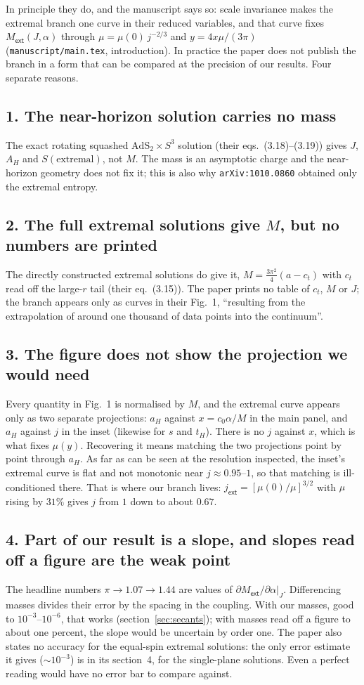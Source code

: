 \documentclass[11pt,a4paper]{article}
\newcommand{\q}[1]{\subsection*{\color{accent}#1}}
\newcommand{\ext}{\mathsf{ext}}
\begin{document}
\noindent In principle they do, and the manuscript says so: scale invariance
makes the extremal branch one curve in their reduced variables, and that curve
fixes $M_\ext(J,\alpha)$ through $\mu=\mu(0)\,j^{-2/3}$ and $y=4x\mu/(3\pi)$
(\texttt{manuscript/main.tex}, introduction). In practice the paper does not
publish the branch in a form that can be compared at the precision of our
results. Four separate reasons.

\q{1. The near-horizon solution carries no mass}

The exact rotating squashed $\mathrm{AdS}_2\times S^3$ solution (their
eqs.~(3.18)--(3.19)) gives $J$, $A_H$ and $S(\text{extremal})$, not $M$. The mass
is an asymptotic charge and the near-horizon geometry does not fix it; this is
also why \texttt{arXiv:1010.0860} obtained only the extremal entropy.

\q{2. The full extremal solutions give $M$, but no numbers are printed}

The directly constructed extremal solutions do give it,
$M=\tfrac{3\pi^2}{4}(a-c_t)$ with $c_t$ read off the large-$r$ tail
(their eq.~(3.15)). The paper prints no table of $c_t$, $M$ or $J$; the branch
appears only as curves in their Fig.~1, ``resulting from the extrapolation of
around one thousand of data points into the continuum''.

\q{3. The figure does not show the projection we would need}

Every quantity in Fig.~1 is normalised by $M$, and the extremal curve appears
only as two separate projections: $a_H$ against $x=c_0\alpha/M$ in the main
panel, and $a_H$ against $j$ in the inset (likewise for $s$ and $t_H$). There is
no $j$ against $x$, which is what fixes $\mu(y)$. Recovering it means matching
the two projections point by point through $a_H$. As far as can be seen at the
resolution inspected, the inset's extremal curve is flat and not monotonic near
$j\approx0.95$--$1$, so that matching is ill-conditioned there. That is where our
branch lives: $j_\ext=[\mu(0)/\mu]^{3/2}$ with $\mu$ rising by $31\%$ gives $j$
from $1$ down to about $0.67$.

\q{4. Part of our result is a slope, and slopes read off a figure are the weak point}

The headline numbers $\pi\to1.07\to1.44$ are values of
$\partial M_\ext/\partial\alpha|_J$. Differencing masses divides their error by
the spacing in the coupling. With our masses, good to $10^{-3}$--$10^{-6}$, that
works (section~\ref{sec:secants}); with masses read off a figure to about one
percent, the slope would be uncertain by order one. The paper also states no accuracy for the equal-spin extremal
solutions: the only error estimate it gives ($\sim10^{-3}$) is in its section~4,
for the single-plane solutions. Even a perfect reading would have no error bar to
compare against.
\end{document}
